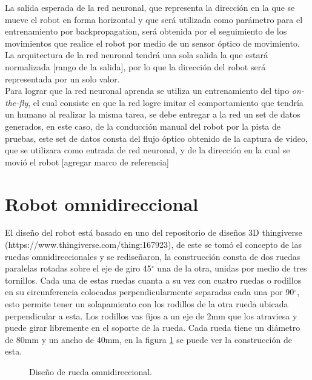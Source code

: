 \documentclass{iccmemoria}
\begin{document}
La salida esperada de la red neuronal, que representa la dirección en la que se mueve el robot en forma horizontal y que será utilizada como parámetro para el entrenamiento por backpropagation, será obtenida por el seguimiento de los movimientos que realice el robot por medio de un sensor óptico de movimiento. La arquitectura de la red neuronal tendrá una sola salida la que estará normalizada [rango de la salida], por lo que la dirección del robot será representada por un solo valor.\\

Para lograr que la red neuronal aprenda se utiliza un entrenamiento del tipo \emph{on-the-fly}, el cual consiste en que la red logre imitar el comportamiento que tendría un humano al realizar la misma tarea, se debe entregar a la red un set de datos generados, en este caso, de la conducción manual del robot por la pista de pruebas, este set de datos consta del flujo óptico obtenido de la captura de video, que se utilizara como entrada de red neuronal, y de la dirección en la cual se movió el robot [agregar marco de referencia] \\

\section{Robot omnidireccional}

El diseño del robot está basado en uno del repositorio de diseños 3D thingiverse (https://www.thingiverse.com/thing:167923), de este se tomó el concepto de las ruedas omnidireccionales y se rediseñaron, la construcción consta de dos ruedas paralelas rotadas sobre el eje de giro 45$^{\circ}$ una de la otra, unidas por medio de tres tornillos. Cada una de estas ruedas cuanta a su vez con cuatro ruedas o rodillos en su circunferencia colocadas perpendicularmente separadas cada una por 90$^{\circ}$, esto permite tener un solapamiento con los rodillos de la otra rueda ubicada perpendicular a esta. Los rodillos vas fijos a un eje de 2mm que los atraviesa y puede girar libremente en el soporte de la rueda. Cada rueda tiene un diámetro de 80mm y un ancho de 40mm, en la figura \ref{fig:image_omni_whell_2} se puede ver la construcción de esta.\\

\begin{figure}[H]
  \centering
  
  \caption{Diseño de rueda omnidireccional.}
  \label{fig:image_omni_whell_2}
\end{figure}
\end{document}
